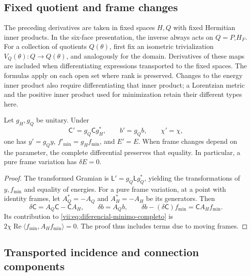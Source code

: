 \subsection{Fixed quotient and frame changes}
\label{vii:subsec:marcos-minimo}

The preceding derivatives are taken in fixed spaces \(H,Q\) with fixed
Hermitian inner products. In the six-face presentation, the inverse always
acts on \(Q=P_\square H_F\). For a collection of quotients
\(Q(\theta)\), first fix an isometric trivialization
\(V_Q(\theta):Q\to Q(\theta)\), and analogously for the domain.
Derivatives of these maps are included when differentiating expressions
transported to the fixed spaces. The formulas apply on each
open set where rank is preserved. Changes to the energy inner product
also require differentiating that inner product; a Lorentzian metric
and the positive inner product used for minimization retain their
different types here.

\begin{proposition}
\label{vii:prop:covariancia-minimo}
Let \(g_H,g_Q\) be unitary. Under
\[
 \mathsf C'=g_Q\mathsf C g_H^*,\qquad b'=g_Qb,\qquad \chi'=\chi,
\]
one has \(y'=g_Qy\), \(f'_{\min}=g_Hf_{\min}\), and \(E'=E\).
When frame changes depend on the parameter, the complete
differential preserves that equality. In particular, a pure frame
variation has \(\delta E=0\).
\end{proposition}

\begin{proof}
The transformed Gramian is \(\mathsf L'=g_Q\mathsf Lg_Q^*\),
yielding the transformations of \(y,f_{\min}\) and
equality of energies. For a pure frame variation, at a point
with identity frames, let \(A_Q^*=-A_Q\) and \(A_H^*=-A_H\)
be its generators. Then
\[
 \delta\mathsf C=A_Q\mathsf C-\mathsf C A_H,\qquad
 \delta b=A_Qb,\qquad
 \delta b-(\delta\mathsf C)f_{\min}=\mathsf C A_Hf_{\min}.
\]
Its contribution to \eqref{vii:eq:diferencial-minimo-completo} is
\(2\chi\operatorname{Re}\langle f_{\min},A_Hf_{\min}\rangle=0\).
The proof thus includes terms due to moving frames.
\end{proof}

\subsection{Transported incidence and connection components}
\label{vii:subsec:incidencia-conexion-minima}

